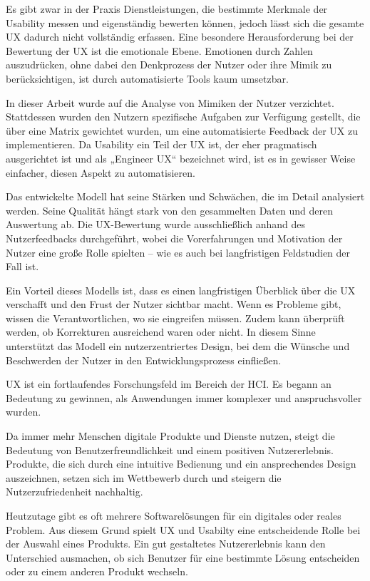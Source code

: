 \documentclass[12pt,oneside]{article}
\begin{document}
Es gibt zwar in der Praxis Dienstleistungen, die bestimmte Merkmale der Usability messen und eigenständig bewerten können, jedoch lässt sich die gesamte UX dadurch nicht vollständig erfassen. Eine besondere Herausforderung bei der Bewertung der UX ist die emotionale Ebene. Emotionen durch Zahlen auszudrücken, ohne dabei den Denkprozess der Nutzer oder ihre Mimik zu berücksichtigen, ist durch automatisierte Tools kaum umsetzbar.

In dieser Arbeit wurde auf die Analyse von Mimiken der Nutzer verzichtet. Stattdessen wurden den Nutzern spezifische Aufgaben zur Verfügung gestellt, die über eine Matrix gewichtet wurden, um eine automatisierte Feedback der UX zu implementieren. Da Usability ein Teil der UX ist, der eher pragmatisch ausgerichtet ist und als „Engineer UX“ bezeichnet wird, ist es in gewisser Weise einfacher, diesen Aspekt zu automatisieren.

Das entwickelte Modell hat seine Stärken und Schwächen, die im Detail analysiert werden. Seine Qualität hängt stark von den gesammelten Daten und deren Auswertung ab. Die UX-Bewertung wurde ausschließlich anhand des Nutzerfeedbacks durchgeführt, wobei die Vorerfahrungen und Motivation der Nutzer eine große Rolle spielten – wie es auch bei langfristigen Feldstudien der Fall ist.

Ein Vorteil dieses Modells ist, dass es einen langfristigen Überblick über die UX verschafft und den Frust der Nutzer sichtbar macht. Wenn es Probleme gibt, wissen die Verantwortlichen, wo sie eingreifen müssen. Zudem kann überprüft werden, ob Korrekturen ausreichend waren oder nicht. In diesem Sinne unterstützt das Modell ein nutzerzentriertes Design, bei dem die Wünsche und Beschwerden der Nutzer in den Entwicklungsprozess einfließen.



UX ist ein fortlaufendes Forschungsfeld im Bereich der HCI. Es begann an Bedeutung zu gewinnen, als Anwendungen immer komplexer und anspruchsvoller wurden.\newline

Da immer mehr Menschen digitale Produkte und Dienste nutzen, steigt die Bedeutung von Benutzerfreundlichkeit und einem positiven Nutzererlebnis. Produkte, die sich durch eine intuitive Bedienung und ein ansprechendes Design auszeichnen, setzen sich im Wettbewerb durch und steigern die Nutzerzufriedenheit nachhaltig.\newline

Heutzutage gibt es oft mehrere Softwarelösungen für ein digitales oder reales Problem. Aus diesem Grund spielt UX und Usabilty eine entscheidende Rolle bei der Auswahl eines Produkts. Ein gut gestaltetes Nutzererlebnis kann den Unterschied ausmachen, ob sich Benutzer für eine bestimmte Lösung entscheiden oder zu einem anderen Produkt wechseln.\newline
\end{document}
